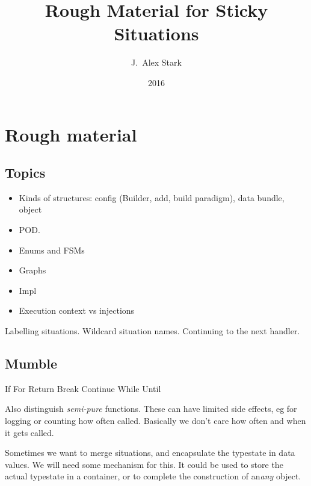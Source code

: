 \documentclass[10pt]{amsart}
\begin{document}
\title[Rough Material]{%
  Rough Material for Sticky Situations}
\author{J.~Alex Stark}
\date{2016}
\maketitle

\tableofcontents
\listofcodex


\nocite{*}

\section{Rough material}

\subsection{Topics}

\begin{itemize}
\item Kinds of structures: config (Builder, add, build paradigm), data
  bundle, object
\item POD.
%
\item Enums and FSMs
\item Graphs
\item Impl
\item Execution context vs injections
\end{itemize}

Labelling situations.  Wildcard situation names.  Continuing to the
next handler.

\subsection{Mumble}



If
For
Return
Break
Continue
While
Until

Also distinguish \emph{semi-pure} functions.  These can have limited
side effects, eg for logging or counting how often called.  Basically
we don't care how often and when it gets called.



Sometimes we want to merge situations, and encapsulate the typestate
in data values.  We will need some mechanism for this.  It could be
used to store the actual typestate in a container, or to complete the
construction of an\emph{any} object.
\end{document}

